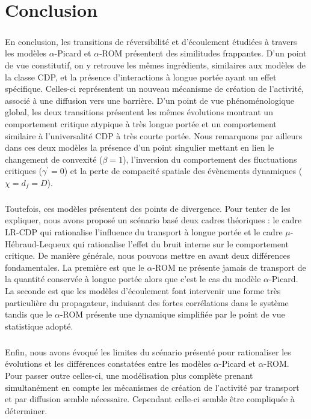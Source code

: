 \section{Conclusion}

\subparagraph{}En conclusion, les transitions de réversibilité et d'écoulement étudiées à travers les modèles $\alpha$-Picard et $\alpha$-ROM présentent des similitudes frappantes. D'un point de vue constitutif, on y retrouve les mêmes ingrédients, similaires aux modèles de la classe CDP, et la présence d'interactions à longue portée ayant un effet spécifique. Celles-ci représentent un nouveau mécanisme de création de l'activité, associé à une diffusion vers une barrière. D'un point de vue phénoménologique global, les deux transitions présentent les mêmes évolutions montrant un comportement critique atypique à très longue portée et un comportement similaire à l'universalité CDP à très courte portée. Nous remarquons par ailleurs dans ces deux modèles la présence d'un point singulier mettant en lien le changement de convexité ($\beta = 1$), l'inversion du comportement des fluctuations critiques ($\gamma^\prime = 0$) et la perte de compacité spatiale des évènements dynamiques ($\chi = d_f = D$).


\subparagraph{}Toutefois, ces modèles présentent des points de divergence. Pour tenter de les expliquer, nous avons proposé un scénario basé deux cadres théoriques : le cadre LR-CDP qui rationalise l'influence du transport à longue portée et le cadre $\mu$-Hébraud-Lequeux qui rationalise l'effet du bruit interne sur le comportement critique. De manière générale, nous pouvons mettre en avant deux différences fondamentales. La première est que le $\alpha$-ROM ne présente jamais de transport de la quantité conservée à longue portée alors que c'est le cas du modèle $\alpha$-Picard. La seconde est que les modèles d'écoulement font intervenir une forme très particulière du propagateur, induisant des fortes corrélations dans le système tandis que le $\alpha$-ROM présente une dynamique simplifiée par le point de vue statistique adopté.

\subparagraph{}Enfin, nous avons évoqué les limites du scénario présenté pour rationaliser les évolutions et les différences constatées entre les modèles $\alpha$-Picard et $\alpha$-ROM. Pour passer outre celles-ci, une modélisation plus complète prenant simultanément en compte les mécanismes de création de l'activité par transport et par diffusion semble nécessaire. Cependant celle-ci semble être compliquée à déterminer.

